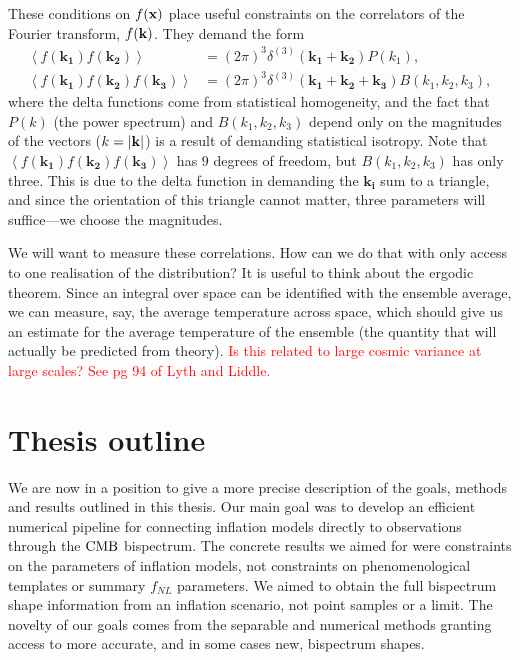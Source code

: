     These conditions on $f(\mathbf{x})$ place useful constraints on the correlators of the
    Fourier transform, $f(\mathbf{k})$. They demand the form
    \begin{align}
        \left<f(\mathbf{k_1})f(\mathbf{k_2})\right> &= (2\pi)^3\delta^{(3)}(\mathbf{k_1}+\mathbf{k_2})P(k_1),\\
        \left<f(\mathbf{k_1})f(\mathbf{k_2})f(\mathbf{k_3})\right> &= (2\pi)^3\delta^{(3)}(\mathbf{k_1}+\mathbf{k_2}+\mathbf{k_3})B(k_1,k_2,k_3),
    \end{align}
    where the delta functions come from statistical homogeneity, and the fact that $P(k)$ (the power spectrum)
    and $B(k_1,k_2,k_3)$ depend only on the magnitudes of the vectors ($k=\left|\mathbf{k}\right|$) is a result
    of demanding statistical isotropy. Note that $\left<f(\mathbf{k_1})f(\mathbf{k_2})f(\mathbf{k_3})\right>$
    has $9$ degrees of freedom, but $B(k_1,k_2,k_3)$ has only three. This is due to the delta function in
    demanding the $\mathbf{k_i}$ sum to a triangle, and since the orientation of this triangle cannot matter,
    three parameters will suffice---we choose the magnitudes.


    We will want to measure these correlations. How can we do that with only access to one realisation
    of the distribution? It is useful to think about the ergodic theorem. Since an integral over
    space can be identified with the ensemble average, we can measure, say, the average temperature
    across space, which should give us an estimate for the average temperature of the ensemble
    (the quantity that will actually be predicted from theory).
    \textcolor{red}{Is this related to large cosmic variance at large scales? See pg 94 of Lyth and Liddle.}


\section{Thesis outline}
    We are now in a position to give a more precise description of the goals, methods
    and results outlined in this thesis.
    Our main goal was to develop an efficient numerical pipeline for
    connecting inflation models directly to observations through the $\text{CMB}$ bispectrum.
    The concrete results we aimed for were constraints on the parameters of inflation models,
    not constraints on phenomenological templates or summary $f_{NL}$ parameters.
    We aimed to obtain the full bispectrum shape information from an inflation scenario,
    not point samples or a limit. The novelty of our goals comes from the separable
    and numerical methods
    granting access to more accurate, and in some cases new, bispectrum shapes.


